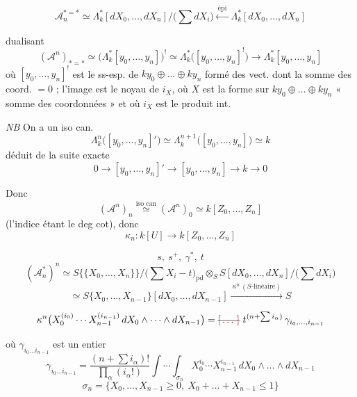 \documentclass[11pt,a4paper]{article}
\begin{document}
\[
  \mathcal{A}_n^{*=*}\simeq
  {\textstyle\Lambda}^{*}_k[dX_0,\dots,dX_n]\big/\bigl(\textstyle\sum dX_i\bigr)
  \xleftarrow{\ \text{épi}\ }{\textstyle\Lambda}^{*}_k[dX_0,\dots,dX_n]
\]

dualisant
\[
  (\mathcal{A}^n)_{*=*}\simeq
  \bigl({\textstyle\Lambda}^{*}_k[y_0,\dots,y_n]\bigr)^{!}
  \simeq{\textstyle\Lambda}^{*}_k\bigl([y_0,\dots,y_n]^{!}\bigr)
  \longrightarrow{\textstyle\Lambda}^{*}_k[y_0,\dots,y_n]
\]
où $[y_0,\dots,y_n]^{!}$ est le ss-esp. de $ky_0\oplus\dots\oplus ky_n$ formé
des vect. dont la somme des coord. $=0$ ; l'image est le noyau de $i_X$, où
$X$ est la forme sur $ky_0\oplus\dots\oplus ky_n$ « somme des coordonnées » et
où $i_X$ est le produit int.

\emph{NB} On a un iso can.
\[
  {\textstyle\Lambda}^{n}_k\bigl([y_0,\dots,y_n]'\bigr)\simeq
  {\textstyle\Lambda}^{n+1}_k\bigl([y_0,\dots,y_n]\bigr)\simeq k
\]
déduit de la suite exacte
\[
  0\longrightarrow[y_0,\dots,y_n]'\longrightarrow[y_0,\dots,y_n]
  \longrightarrow k\longrightarrow0
\]

Donc
\[
  (\mathcal{A}^n)_n\overset{\text{iso can}}{\simeq}(\mathcal{A}^n)_0
  \simeq k[Z_0,\dots,Z_n]
\]
(l'indice étant le deg cot), donc
\[
  \kappa_n : k[U]\longrightarrow k[Z_0,\dots,Z_n]
\]

\[
  s,\ s^+,\ \gamma^*,\ t
\]
\[
  (\mathcal{A}^{*}_{n})^{n}\simeq
  S\{\{X_0,\dots,X_n\}\}\big/\bigl(\textstyle\sum X_i-t\bigr)_{\mathrm{pd}}
  \otimes_S S[dX_0,\dots,dX_n]\big/\bigl(\textstyle\sum dX_i\bigr)
\]
\[
  \simeq S\{X_0,\dots,X_{n-1}\}[dX_0,\dots,dX_{n-1}]
  \xrightarrow{\ \kappa^n\ (S\text{-linéaire})\ } S
\]

\[
  \kappa^n\bigl(X_0^{(i_0)}\cdots X_{n-1}^{(i_{n-1})}\,dX_0\wedge\dots\wedge dX_{n-1}\bigr)
  =\text{\struck{\ill{}}}\ t^{(n+\sum i_\alpha)}\,\gamma_{i_0,\dots,i_{n-1}}
\]

où $\gamma_{i_0\dots i_{n-1}}$ est un entier 
\[
  \gamma_{i_0\dots i_{n-1}}=\frac{(n+\sum i_\alpha)!}{\prod_\alpha(i_\alpha!)}
  \int\!\!\cdots\!\!\int_{\sigma_n}X_0^{i_0}\cdots X_{n-1}^{i_{n-1}}\,
  dX_0\wedge\dots\wedge dX_{n-1}
\]
\[
  \sigma_n=\{X_0,\dots,X_{n-1}\geqslant0,\ X_0+\dots+X_{n-1}\leqslant1\}
\]
\end{document}
